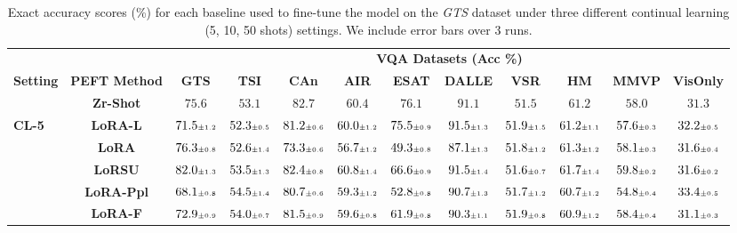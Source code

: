 \begin{table}
\caption{Exact accuracy scores (\%) for each baseline used to fine-tune the model on the \emph{GTS} dataset under three different continual learning (5, 10, 50 shots)  settings. We include error bars over 3 runs.}
 \label{table:fine_tune_llm_gtsrb}
\vskip 0.15in
\begin{center}
\begin{small}
\begingroup
\setlength{\tabcolsep}{3.6pt}
\begin{tabular}{l c c c c c c c c c c c}
\toprule
 & & \multicolumn{10}{c}{\textbf{VQA Datasets (Acc \%)}}  \\
\cmidrule(lr){3-12}
\textbf{Setting} & \textbf{PEFT Method}  & \textbf{GTS} & \textbf{TSI} & \textbf{CAn} & \textbf{AIR} & \textbf{ESAT} & \textbf{DALLE} & \textbf{VSR} & \textbf{HM} & \textbf{MMVP} & \textbf{VisOnly} \\
\midrule
 & \textbf{Zr-Shot} & $75.6$ & $53.1$ & $82.7$ & $60.4$ & $76.1$ & $91.1$ & $51.5$ & $61.2$ & $58.0$ & $31.3$ \\
\midrule
\multirow{6}{*}{\textbf{CL-5}} & \textbf{LoRA-L} & $71.5 \mbox{\tiny\ensuremath{\pm 1.2}}$ & $52.3 \mbox{\tiny\ensuremath{\pm 0.5}}$ & $81.2 \mbox{\tiny\ensuremath{\pm 0.6}}$ & $60.0 \mbox{\tiny\ensuremath{\pm 1.2}}$ & $75.5 \mbox{\tiny\ensuremath{\pm 0.9}}$ & $91.5 \mbox{\tiny\ensuremath{\pm 1.3}}$ & $51.9 \mbox{\tiny\ensuremath{\pm 1.5}}$ & $61.2 \mbox{\tiny\ensuremath{\pm 1.1}}$ & $57.6 \mbox{\tiny\ensuremath{\pm 0.3}}$ & $32.2 \mbox{\tiny\ensuremath{\pm 0.5}}$ \\
& \textbf{LoRA} & $76.3 \mbox{\tiny\ensuremath{\pm 0.8}}$ & $52.6 \mbox{\tiny\ensuremath{\pm 1.4}}$ & $73.3 \mbox{\tiny\ensuremath{\pm 0.6}}$ & $56.7 \mbox{\tiny\ensuremath{\pm 1.2}}$ & $49.3 \mbox{\tiny\ensuremath{\pm 0.8}}$ & $87.1 \mbox{\tiny\ensuremath{\pm 1.3}}$ & $51.8 \mbox{\tiny\ensuremath{\pm 1.2}}$ & $61.3 \mbox{\tiny\ensuremath{\pm 1.2}}$ & $58.1 \mbox{\tiny\ensuremath{\pm 0.3}}$ & $31.6 \mbox{\tiny\ensuremath{\pm 0.4}}$ \\
& \textbf{LoRSU} & $82.0 \mbox{\tiny\ensuremath{\pm 1.3}}$ & $53.5 \mbox{\tiny\ensuremath{\pm 1.3}}$ & $82.4 \mbox{\tiny\ensuremath{\pm 0.8}}$ & $60.8 \mbox{\tiny\ensuremath{\pm 1.4}}$ & $66.6 \mbox{\tiny\ensuremath{\pm 0.9}}$ & $91.5 \mbox{\tiny\ensuremath{\pm 1.4}}$ & $51.6 \mbox{\tiny\ensuremath{\pm 0.7}}$ & $61.7 \mbox{\tiny\ensuremath{\pm 1.4}}$ & $59.8 \mbox{\tiny\ensuremath{\pm 0.2}}$ & $31.6 \mbox{\tiny\ensuremath{\pm 0.2}}$ \\
& \textbf{LoRA-Ppl} & $68.1 \mbox{\tiny\ensuremath{\pm 0.8}}$ & $54.5 \mbox{\tiny\ensuremath{\pm 1.4}}$ & $80.7 \mbox{\tiny\ensuremath{\pm 0.6}}$ & $59.3 \mbox{\tiny\ensuremath{\pm 1.2}}$ & $52.8 \mbox{\tiny\ensuremath{\pm 0.8}}$ & $90.7 \mbox{\tiny\ensuremath{\pm 1.3}}$ & $51.7 \mbox{\tiny\ensuremath{\pm 1.2}}$ & $60.7 \mbox{\tiny\ensuremath{\pm 1.2}}$ & $54.8 \mbox{\tiny\ensuremath{\pm 0.4}}$ & $33.4 \mbox{\tiny\ensuremath{\pm 0.5}}$ \\
& \textbf{LoRA-F} & $72.9 \mbox{\tiny\ensuremath{\pm 0.9}}$ & $54.0 \mbox{\tiny\ensuremath{\pm 0.7}}$ & $81.5 \mbox{\tiny\ensuremath{\pm 0.9}}$ & $59.6 \mbox{\tiny\ensuremath{\pm 0.8}}$ & $61.9 \mbox{\tiny\ensuremath{\pm 0.8}}$ & $90.3 \mbox{\tiny\ensuremath{\pm 1.1}}$ & $51.9 \mbox{\tiny\ensuremath{\pm 0.8}}$ & $60.9 \mbox{\tiny\ensuremath{\pm 1.2}}$ & $58.4 \mbox{\tiny\ensuremath{\pm 0.4}}$ & $31.1 \mbox{\tiny\ensuremath{\pm 0.3}}$ \\

\end{tabular}
\end{small}
\end{center}
\end{table}

